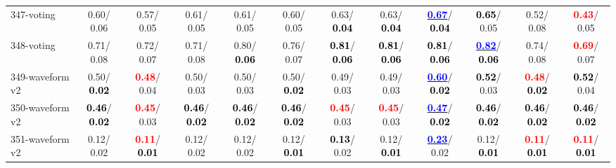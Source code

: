 \begin{table}[h]
\begin{center}
{\begin{tabular}{lc|c|c|c|c|c|c|c|c|c|c}
347-voting &   0.60/  0.06 &   0.57/  0.05 &   0.61/  0.05 &   0.61/  0.05 &   0.60/  0.05 &   0.63/\textcolor{black}{\textbf{  0.04}} &   0.63/\textcolor{black}{\textbf{  0.04}} & \underline{\textcolor{blue}{\textbf{  0.67}}}/\textcolor{black}{\textbf{  0.04}} & \textcolor{black}{\textbf{  0.65}}/  0.05 &   0.52/  0.08 & \textcolor{red}{\textbf{  0.43}}/  0.05 \\
348-voting &   0.71/  0.08 &   0.72/  0.07 &   0.71/  0.08 &   0.80/\textcolor{black}{\textbf{  0.06}} &   0.76/  0.07 & \textcolor{black}{\textbf{  0.81}}/\textcolor{black}{\textbf{  0.06}} & \textcolor{black}{\textbf{  0.81}}/\textcolor{black}{\textbf{  0.06}} & \textcolor{black}{\textbf{  0.81}}/\textcolor{black}{\textbf{  0.06}} & \underline{\textcolor{blue}{\textbf{  0.82}}}/\textcolor{black}{\textbf{  0.06}} &   0.74/  0.08 & \textcolor{red}{\textbf{  0.69}}/  0.07 \\ \hline
349-waveform v2 &   0.50/\textcolor{black}{\textbf{  0.02}} & \textcolor{red}{\textbf{  0.48}}/  0.04 &   0.50/  0.03 &   0.50/  0.03 &   0.50/\textcolor{black}{\textbf{  0.02}} &   0.49/  0.03 &   0.49/  0.03 & \underline{\textcolor{blue}{\textbf{  0.60}}}/\textcolor{black}{\textbf{  0.02}} & \textcolor{black}{\textbf{  0.52}}/  0.03 & \textcolor{red}{\textbf{  0.48}}/\textcolor{black}{\textbf{  0.02}} & \textcolor{black}{\textbf{  0.52}}/  0.04 \\
350-waveform v2 & \textcolor{black}{\textbf{  0.46}}/\textcolor{black}{\textbf{  0.02}} & \textcolor{red}{\textbf{  0.45}}/  0.03 & \textcolor{black}{\textbf{  0.46}}/\textcolor{black}{\textbf{  0.02}} & \textcolor{black}{\textbf{  0.46}}/\textcolor{black}{\textbf{  0.02}} & \textcolor{black}{\textbf{  0.46}}/\textcolor{black}{\textbf{  0.02}} & \textcolor{red}{\textbf{  0.45}}/  0.03 & \textcolor{red}{\textbf{  0.45}}/  0.03 & \underline{\textcolor{blue}{\textbf{  0.47}}}/\textcolor{black}{\textbf{  0.02}} & \textcolor{black}{\textbf{  0.46}}/\textcolor{black}{\textbf{  0.02}} & \textcolor{black}{\textbf{  0.46}}/\textcolor{black}{\textbf{  0.02}} & \textcolor{black}{\textbf{  0.46}}/\textcolor{black}{\textbf{  0.02}} \\
351-waveform v2 &   0.12/  0.02 & \textcolor{red}{\textbf{  0.11}}/\textcolor{black}{\textbf{  0.01}} &   0.12/  0.02 &   0.12/  0.02 &   0.12/\textcolor{black}{\textbf{  0.01}} & \textcolor{black}{\textbf{  0.13}}/  0.02 &   0.12/\textcolor{black}{\textbf{  0.01}} & \underline{\textcolor{blue}{\textbf{  0.23}}}/  0.02 &   0.12/\textcolor{black}{\textbf{  0.01}} & \textcolor{red}{\textbf{  0.11}}/\textcolor{black}{\textbf{  0.01}} & \textcolor{red}{\textbf{  0.11}}/\textcolor{black}{\textbf{  0.01}} \\

\end{tabular}}
\end{center}
\end{table}
